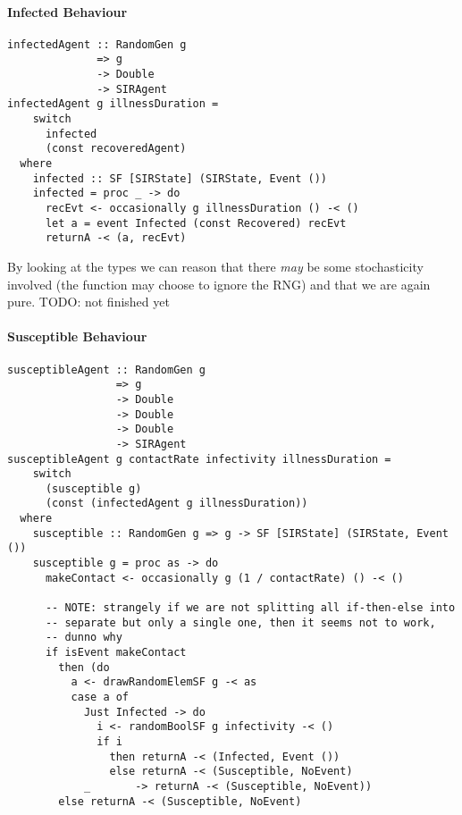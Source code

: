 \paragraph{Infected Behaviour}
\begin{verbatim}
infectedAgent :: RandomGen g 
              => g 
              -> Double
              -> SIRAgent
infectedAgent g illnessDuration = 
    switch 
      infected 
      (const recoveredAgent)
  where
    infected :: SF [SIRState] (SIRState, Event ())
    infected = proc _ -> do
      recEvt <- occasionally g illnessDuration () -< ()
      let a = event Infected (const Recovered) recEvt
      returnA -< (a, recEvt)
\end{verbatim}

By looking at the types we can reason that there \textit{may} be some stochasticity involved (the function may choose to ignore the RNG) and that we are again pure. TODO: not finished yet

\paragraph{Susceptible Behaviour}
\begin{verbatim}
susceptibleAgent :: RandomGen g 
                 => g 
                 -> Double
                 -> Double
                 -> Double 
                 -> SIRAgent
susceptibleAgent g contactRate infectivity illnessDuration = 
    switch
      (susceptible g) 
      (const (infectedAgent g illnessDuration))
  where
    susceptible :: RandomGen g => g -> SF [SIRState] (SIRState, Event ())
    susceptible g = proc as -> do
      makeContact <- occasionally g (1 / contactRate) () -< ()

      -- NOTE: strangely if we are not splitting all if-then-else into
      -- separate but only a single one, then it seems not to work,
      -- dunno why
      if isEvent makeContact
        then (do
          a <- drawRandomElemSF g -< as
          case a of
            Just Infected -> do
              i <- randomBoolSF g infectivity -< ()
              if i
                then returnA -< (Infected, Event ())
                else returnA -< (Susceptible, NoEvent)
            _       -> returnA -< (Susceptible, NoEvent))
        else returnA -< (Susceptible, NoEvent)
\end{verbatim}
